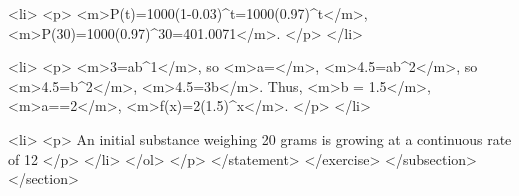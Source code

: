                         <li>
                            <p>
                                <m>P(t)=1000(1-0.03)^{t}=1000(0.97)^{t}</m>, <m>P(30)=1000(0.97)^{30}=401.0071</m>.
                            </p>
                        </li>

                        <li>
                            <p>
                                <m>3=ab^{1}</m>, so <m>a=</m>, <m>4.5=ab^{2}</m>, so <m>4.5=b^{2}</m>, <m>4.5=3b</m>. Thus, <m>b = 1.5</m>, <m>a==2</m>, <m>f(x)=2(1.5)^{x}</m>.
                            </p>
                        </li>

                        <li>
                            <p>
                                An initial substance weighing 20 grams is growing at a continuous rate of 12%
                            </p>
                        </li>
                    </ol>
                </p>
            </statement>
        </exercise>
    </subsection>
</section>